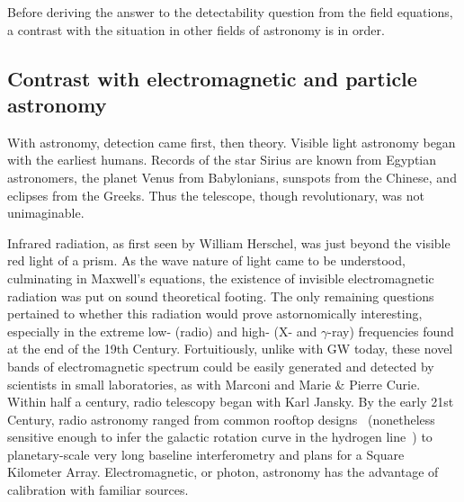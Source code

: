 Before deriving the answer to the detectability question from the field equations, a contrast with the situation in other fields of astronomy is in order.

 
        \subsection{Contrast with electromagnetic and particle astronomy}
        \label{contrast_astro}

        With astronomy, detection came first, then theory.
Visible light astronomy began with the earliest humans.
Records of the star Sirius are known from Egyptian astronomers, the planet Venus from Babylonians, sunspots from the Chinese, and eclipses from the Greeks. 
Thus the telescope, though revolutionary, was not unimaginable.

Infrared radiation, as first seen by William Herschel, was just beyond the visible red light of a prism.
As the wave nature of light came to be understood, culminating in Maxwell's equations, the existence of invisible electromagnetic radiation was put on sound theoretical footing.
The only remaining questions pertained to whether this radiation would prove astornomically interesting, especially in the extreme low- (radio) and high- (X- and $\gamma$-ray) frequencies found at the end of the 19th Century.
Fortuitiously, unlike with GW today, these novel bands of electromagnetic spectrum could be easily generated and detected by scientists in small laboratories, as with Marconi and Marie \& Pierre Curie.
Within half a century, radio telescopy began with Karl Jansky.
By the early 21st Century, radio astronomy ranged from common rooftop designs~\cite{SRT} (nonetheless sensitive enough to infer the galactic rotation curve in the hydrogen line~\cite{MeadorsThesis2008}) to planetary-scale very long baseline interferometry and plans for a Square Kilometer Array.
Electromagnetic, or photon, astronomy has the advantage of calibration with familiar sources.




